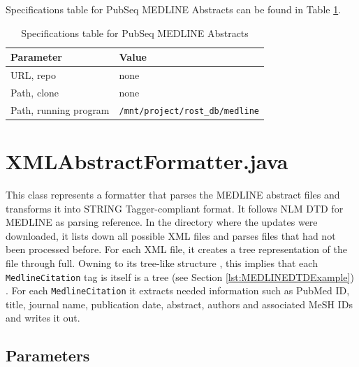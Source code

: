 Specifications table for PubSeq MEDLINE Abstracts can be found in Table \ref{tab:PubSeqMEDLINEAbstracts}.

\begin{table}[htbp]
\caption{Specifications table for PubSeq MEDLINE Abstracts}
\centering
\begin{tabular}{ | l | l | }
  \hline
  Parameter & Value \\
  \hline
  URL, repo & none \\
  Path, clone & none \\
  Path, running program & \texttt{/mnt/project/rost\_db/medline}\\
  \hline
\end{tabular}
\label{tab:PubSeqMEDLINEAbstracts}
\end{table}



\section{XMLAbstractFormatter.java}

\label{sec:XMLAbstractFormatter}

This class represents a formatter that parses the MEDLINE abstract files and transforms it into STRING Tagger-compliant format. It follows NLM DTD for MEDLINE \citep{MEDLINEDTD} as parsing reference. In the directory where the updates were downloaded, it lists down all possible XML files and parses files that had not been processed before. For each XML file, it creates a tree representation of the file through full. Owning to its tree-like structure \citep{bray2011extensible} \citep{MEDLINEDTD}, this implies that each \texttt{MedlineCitation} tag is itself is a tree (see Section \ref{lst:MEDLINEDTDExample}) . For each \texttt{MedlineCitation} it extracts needed information such as PubMed ID, title, journal name, publication date, abstract, authors and associated MeSH IDs \citep{lowe1994understanding} and writes it out.

\subsection{Parameters}

